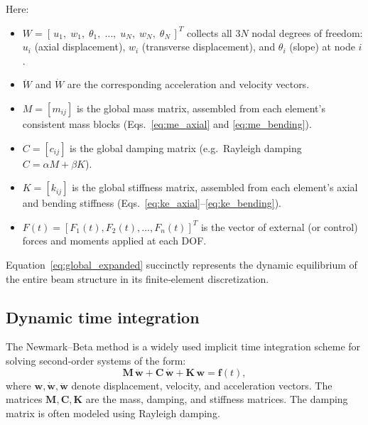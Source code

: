 \documentclass{article}
\begin{document}
	Here:
	\begin{itemize}
		\item \(W = [\,u_1,\;w_1,\;\theta_1,\;\dots,\;u_N,\;w_N,\;\theta_N\,]^T\) collects all \(3N\) nodal degrees of freedom: 
		\(u_i\) (axial displacement), \(w_i\) (transverse displacement), and \(\theta_i\) (slope) at node \(i\).
		\item \(\ddot W\) and \(\dot W\) are the corresponding acceleration and velocity vectors.
		\item \(M = [m_{ij}]\) is the global mass matrix, assembled from each element’s consistent mass blocks (Eqs.~\eqref{eq:me_axial} and \eqref{eq:me_bending}).
		\item \(C = [c_{ij}]\) is the global damping matrix (e.g.\ Rayleigh damping \(C=\alpha M + \beta K\)).
		\item \(K = [k_{ij}]\) is the global stiffness matrix, assembled from each element’s axial and bending stiffness (Eqs.~\eqref{eq:ke_axial}–\eqref{eq:ke_bending}).
		\item \(F(t) = [F_1(t),F_2(t),\dots,F_n(t)]^T\) is the vector of external (or control) forces and moments applied at each DOF.
	\end{itemize}
	
	Equation~\eqref{eq:global_expanded} succinctly represents the dynamic equilibrium of the entire beam structure in its finite‐element discretization.
	
		

	
	\subsection{Dynamic time integration}
	
	The Newmark--Beta method is a widely used implicit time integration scheme for solving second-order systems of the form:
	\begin{equation}
		\mathit{\mathbf{M}}\, \ddot{\mathit{\mathbf{w}}} + \mathit{\mathbf{C}}\, \dot{\mathit{\mathbf{w}}} + \mathit{\mathbf{K}}\, \mathit{\mathbf{w}} = \mathit{\mathbf{f}}(t),
	\end{equation}
	where \( \mathit{\mathbf{w}}, \dot{\mathit{\mathbf{w}}}, \ddot{\mathit{\mathbf{w}}} \) denote displacement, velocity, and acceleration vectors. The matrices \( \mathit{\mathbf{M}}, \mathit{\mathbf{C}}, \mathit{\mathbf{K}} \) are the mass, damping, and stiffness matrices. The damping matrix is often modeled using Rayleigh damping.
	
\end{document}
